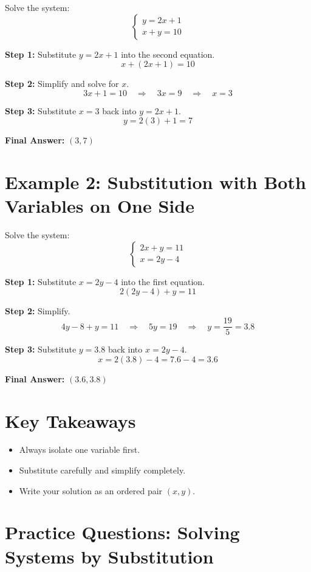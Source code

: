 \documentclass[12pt]{article}
\begin{document}
Solve the system:
\[
\begin{cases}
y = 2x + 1 \\
x + y = 10
\end{cases}
\]

\textbf{Step 1:} Substitute \(y = 2x + 1\) into the second equation.
\[
x + (2x + 1) = 10
\]

\textbf{Step 2:} Simplify and solve for \(x\).
\[
3x + 1 = 10 \quad \Rightarrow \quad 3x = 9 \quad \Rightarrow \quad x = 3
\]

\textbf{Step 3:} Substitute \(x = 3\) back into \(y = 2x + 1\).
\[
y = 2(3) + 1 = 7
\]

\textbf{Final Answer:} \(\boxed{(3, 7)}\)

\section*{Example 2: Substitution with Both Variables on One Side}

Solve the system:
\[
\begin{cases}
2x + y = 11 \\
x = 2y - 4
\end{cases}
\]

\textbf{Step 1:} Substitute \(x = 2y - 4\) into the first equation.
\[
2(2y - 4) + y = 11
\]

\textbf{Step 2:} Simplify.
\[
4y - 8 + y = 11 \quad \Rightarrow \quad 5y = 19 \quad \Rightarrow \quad y = \dfrac{19}{5} = 3.8
\]

\textbf{Step 3:} Substitute \(y = 3.8\) back into \(x = 2y - 4\).
\[
x = 2(3.8) - 4 = 7.6 - 4 = 3.6
\]

\textbf{Final Answer:} \(\boxed{(3.6, 3.8)}\)

\section*{Key Takeaways}
\begin{itemize}
    \item Always isolate one variable first.
    \item Substitute carefully and simplify completely.
    \item Write your solution as an ordered pair \((x, y)\).
\end{itemize}

\newpage

\section*{Practice Questions: Solving Systems by Substitution}
\end{document}
